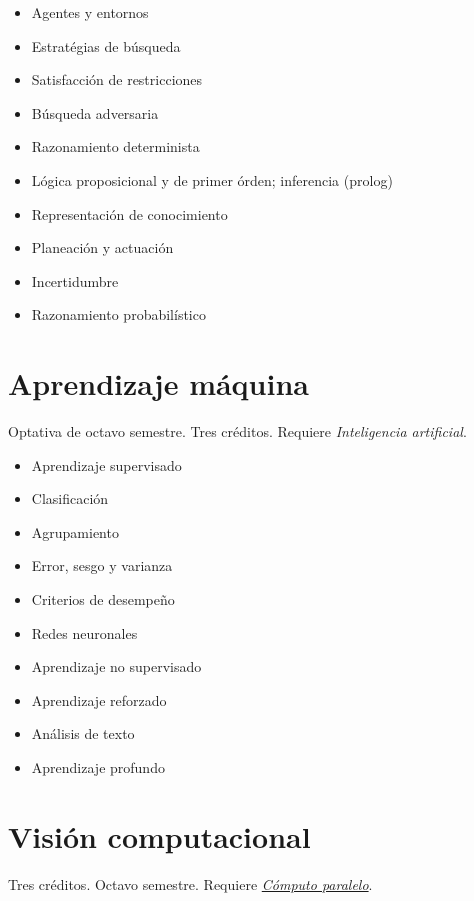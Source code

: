 \documentclass{article}
\begin{document}
\begin{multicols}{4}
\begin{itemize}
\item{Agentes y entornos}
\item{Estrat\'{e}gias de b\'{u}squeda}
\item{Satisfacci\'{o}n de restricciones}
\item{B\'{u}squeda adversaria}
\item{Razonamiento determinista}
\item{L\'{o}gica proposicional y de primer \'{o}rden; inferencia (prolog)}
\item{Representaci\'{o}n de conocimiento}
\item{Planeaci\'{o}n y actuaci\'{o}n}
\item{Incertidumbre}
\item{Razonamiento probabil\'{i}stico}
\end{itemize}

\vfill\null \columnbreak

\hypertarget{am}{\section*{Aprendizaje m\'{a}quina}} 

Optativa de octavo semestre. Tres cr\'{e}ditos. Requiere {\em Inteligencia artificial}.

\begin{itemize}
\item{Aprendizaje supervisado}
\item{Clasificaci\'{o}n}
\item{Agrupamiento}  
\item{Error, sesgo y varianza}
\item{Criterios de desempe\~{n}o}
\item{Redes neuronales}
\item{Aprendizaje no supervisado}
\item{Aprendizaje reforzado}  
\item{An\'{a}lisis de texto}
\item{Aprendizaje profundo}
\end{itemize}

\vfill\null \columnbreak

\hypertarget{vc}{\section*{Visi\'{o}n computacional}} 

Tres cr\'{e}ditos. Octavo semestre. Requiere \hyperlink{cp}{\em
  C\'{o}mputo paralelo}.


\end{multicols}
\end{document}
